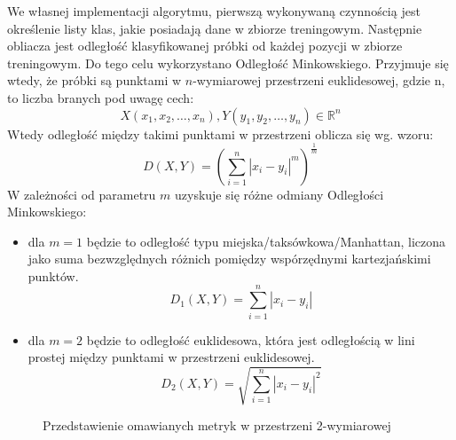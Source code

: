 \documentclass[12pt,a4paper]{article}
\begin{document}
	        We własnej implementacji algorytmu, pierwszą wykonywaną czynnością jest określenie listy klas, jakie posiadają dane w zbiorze treningowym. Następnie obliacza jest odległość klasyfikowanej próbki od każdej pozycji w zbiorze treningowym. Do tego celu wykorzystano Odległość Minkowskiego. Przyjmuje się wtedy, że próbki są punktami w $n$-wymiarowej przestrzeni euklidesowej, gdzie n, to liczba branych pod uwagę cech:
	            $$X(x_1, x_2, \ldots, x_n), Y(y_1, y_2, \ldots, y_n) \in \mathbb{R}^n$$
	       Wtedy odległość między takimi punktami w przestrzeni oblicza się wg. wzoru:
	            $$D(X, Y)=\left(\sum_{i=1}^{n} |x_i-y_i|^m\right)^\frac{1}{m}$$
	       W zależności od parametru $m$ uzyskuje się różne odmiany Odległości Minkowskiego:
	       \begin{itemize}
	           \item dla $m=1$ będzie to odległość typu miejska/taksówkowa/Manhattan, liczona jako suma bezwzględnych różnich pomiędzy wspórzędnymi kartezjańskimi punktów.
	                $$D_1(X, Y)=\sum_{i=1}^{n} |x_i-y_i|$$
	           \item dla $m=2$ będzie to odległość euklidesowa, która jest odległością w lini prostej między punktami w przestrzeni euklidesowej.
	                $$D_2(X, Y)=\sqrt{\sum_{i=1}^{n} |x_i-y_i|^2}$$
	       \end{itemize}
	       
	       \begin{figure}[h!]
    			\centering
    			\label{minkowski-manhattan}
    			\hfil
    			\label{minkowski-euklides}
    			\caption{Przedstawienie omawianych metryk w przestrzeni 2-wymiarowej}
    		\end{figure}
	       
\end{document}
